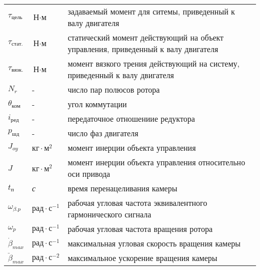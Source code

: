 \begin{longtabu}{X[-1,r]X[-1,l]X[l]}
    $\tau_\textit{цель}$
    & $\textit{Н} \cdot \textit{м}$
    & задаваемый момент для ситемы, приведенный к валу двигателя \\

    $\tau_\textit{стат.}$
    & $\textit{Н} \cdot \textit{м}$
    & статический момент действующий на объект управления, приведенный к валу двигателя \\

    $\tau_\textit{вязк.}$
    & $\textit{Н} \cdot \textit{м}$
    & момент вязкого трения действующий на систему, приведенный к валу двигателя\\

    $N_{r}$                         & -             & число пар полюсов ротора \\

    $\theta_\textit{ком}$           & -             & угол коммутации \\

    $i_\textit{ред}$                & -             & передаточное отношениие редуктора \\

    $p_\textit{шд}$                 & -             & число фаз двигателя \\

    $J_{oy}$                        & $\textit{кг} \cdot \textit{м}^{2}$        & момент инерции объекта управления \\

    $J$                             & $\textit{кг} \cdot \textit{м}^{2}$        & момент инерции объекта управления относительно оси привода \\

    $t_\textit{п}$                  & \textit{с}                                & время перенацеливания камеры \\

    $\omega_{\beta.p}$              & $\textit{рад} \cdot \textit{с}^{-1}$      & рабочая угловая частота эквивалентного гармонического сигнала \\

    $\omega_{p}$                    & $\textit{рад} \cdot \textit{с}^{-1}$      & рабочая угловая частота вращения ротора \\

    $\dot{\beta}_{max}$             & $\textit{рад} \cdot \textit{с}^{-1}$      & максимальная угловая скорость вращения камеры \\

    $\ddot{\beta}_{max}$            & $\textit{рад} \cdot \textit{с}^{-2}$      & максимальное ускорение вращения камеры \\


\end{longtabu}
